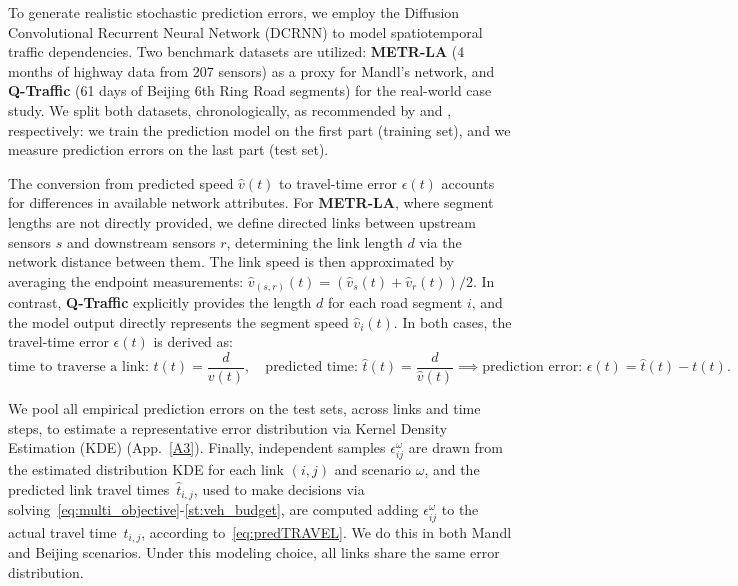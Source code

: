 \documentclass[a4paper,fleqn]{cas-sc}
\begin{document}
To generate realistic stochastic prediction errors, we employ the Diffusion Convolutional Recurrent Neural Network (DCRNN) \citep{li2017diffusion} to model spatiotemporal traffic dependencies. Two benchmark datasets are utilized: \textbf{METR-LA} (4 months of highway data from 207 sensors) as a proxy for Mandl’s network, and \textbf{Q-Traffic} (61 days of Beijing 6th Ring Road segments) for the real-world case study. We split both datasets, chronologically,  as recommended by \citet{li2017diffusion} and \citet{lu2022graph}, respectively: we train the prediction model on the first part (training set), and we measure prediction errors on the last part (test set).

The conversion from predicted speed $\hat{v}(t)$ to travel-time error $\epsilon(t)$ accounts for differences in available network attributes. For \textbf{METR-LA}, where segment lengths are not directly provided, we define directed links between upstream sensors $s$ and downstream sensors $r$, determining the link length $d$ via the network distance between them. The link speed is then approximated by averaging the endpoint measurements: $\hat{v}_{(s,r)}(t) = (\hat{v}_s(t) + \hat{v}_r(t))/2$. In contrast, \textbf{Q-Traffic} explicitly provides the length $d$ for each road segment $i$, and the model output directly represents the segment speed $\hat{v}_i(t)$. In both cases, the travel-time error $\epsilon(t)$ is derived as:
\[
    \text{time to traverse a link: }t(t) = \frac{d}{v(t)}, \quad \text{predicted time: }\hat{t}(t) = \frac{d}{\hat{v}(t)} \implies \text{prediction error: } \epsilon(t) = \hat{t}(t) - t(t).
\]

We pool all empirical prediction errors on the test sets, across links and time steps, to estimate a representative error distribution via Kernel Density Estimation (KDE) (App.~\ref{A3}). Finally, independent samples $\epsilon_{ij}^{\omega}$ are drawn from the estimated distribution KDE for each link $(i,j)$ and scenario $\omega$, and the predicted link travel times~$\hat t_{i,j}$, used to make decisions via solving~\eqref{eq:multi_objective}-\eqref{st:veh_budget}, are computed adding $\epsilon_{ij}^{\omega}$ to the actual travel time~$t_{i,j}$, according to~\eqref{eq:predTRAVEL}. We do this in both Mandl and Beijing scenarios.
Under this modeling choice, all links share the same error distribution.

\end{document}
